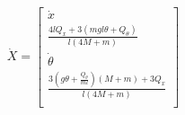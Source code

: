 \begin{equation}
    \dot{X} = \begin{bmatrix}
        \dot{x} \\
        \frac{4l Q_x + 3(mgl\theta + Q_{\theta})}{l(4M + m)} \\ 
        \dot{\theta} \\
        \frac{3(g\theta + \frac{Q_{\theta}}{ml})(M + m) + 3Q_x }{l(4M + m)} \\ 
    \end{bmatrix}
\end{equation}

